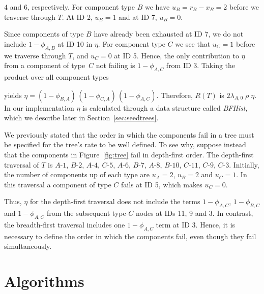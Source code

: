 \documentclass[12pt]{article}
\def\myxout{\bgroup \markoverwith{\textcolor{red}{\hbox to.35em{\hss/\hss}}}\ULon}
\newcommand{\deleted}[1]{}
\newcommand{\changed}[1]{#1}
\newcommand{\changed}[1]{\textcolor{red}{#1}}
\newcommand{\deleted}[1]{{\myxout{#1}}}
\newcommand{\varName}[1]{\textrm{\it#1}}
\newcommand{\nodelabel}[2]{\mbox{$#1$-$#2$}}
\begin{document}
\deleted{$2$ and $5$}
\changed{$4$ and $6$,}
respectively. For component type $B$ we have $u_B = r_B - x_B  = 2$ before we traverse through $T$. \deleted{in breadth-first order. Traversing through $T$,} At ID 2, $u_B = 1$ and at ID 7, $u_B = 0$.
\deleted{Note that the term $1 - \phi_{A, B}$ occurs at ID 10, i.e., after ID 7.}
Since components of type $B$ have already been exhausted at ID 7, we do not include
$1 - \phi_{A, B}$ at ID 10
\changed{in $\eta$}. For component type $C$ we see that $u_C = 1$ before we traverse through $T$, and $u_C = 0$ at ID 5. Hence, the only contribution
\changed{to $\eta$ from a component
of type~$C$ not failing} \deleted{we get}
is $1 - \phi_{A, C}$ from ID 3. Taking the product over all \changed{component types}
\deleted{$j$}
\changed{yields}
$\eta = (1 - \phi_{B, A}) \, (1 - \phi_{C, A}) \, (1 - \phi_{A,C})$. Therefore, $R(T)$ is $2 \lambda_{A, 0} \; \rho \; \eta$. In our implementation $\eta$ is calculated through a data structure called \varName{BFHist}, which we \changed{describe} later
\changed{in Section~\ref{sec:seedtrees}}.

We previously stated that the order in which the components fail in a tree must be specified for the tree's rate to  be well defined. To see why, suppose instead that the components in Figure~\ref{fig:tree} fail
in
\changed{depth-first} order. The depth-first traversal of $T$ is \nodelabel{A}{1}, \nodelabel{B}{2}, \nodelabel{A}{4}, \nodelabel{C}{5}, \nodelabel{A}{6}, \nodelabel{B}{7}, \nodelabel{A}{8}, \nodelabel{B}{10}, \nodelabel{C}{11}, \nodelabel{C}{9}, \nodelabel{C}{3}.
\changed{Initially}, the number of components up of each type are $u_A = 2$, $u_B = 2$ and $u_C = 1$. In this traversal a component of type $C$ fails at ID 5, which makes $u_C = 0$.
\deleted{The term $(1 - \phi_{A, C})$ occurs at IDs 11 and 3; but at either location it is not included because IDs 3 and 11 occur after ID 5.
Thus, we do not get the $(1 - \phi_{A, C})$ term that we got from the breadth-first traversal; giving us a different $R(T)$.} \changed{
Thus, $\eta$ for the
depth-first traversal does not include
the terms $1-\phi_{A,C}$,
$1-\phi_{B,C}$ and
$1-\phi_{A,C}$
from the subsequent type-$C$ nodes
at IDs 11, 9 and 3.
In contrast, the
breadth-first traversal includes
one $1-\phi_{A,C}$ term at ID 3.}
Hence, it is necessary to define the order in which the components fail, even though they fail simultaneously.




\section{Algorithms}
\label{sec:alg}
\end{document}
